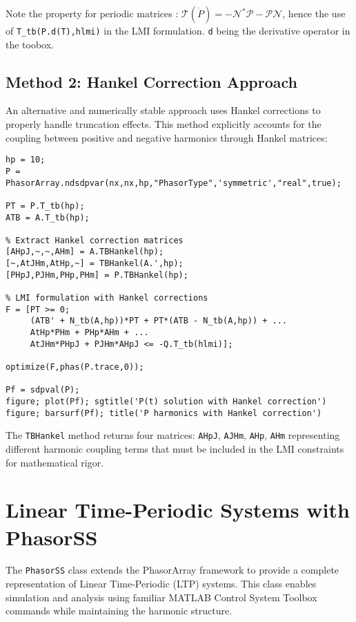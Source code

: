 \documentclass[11pt,a4paper]{article}
\begin{document}
Note the property for periodic matrices : $\mathcal{T}(\dot P) = \mathcal{-N^* P - P N}$, hence the use of \texttt{T\_tb(P.d(T),hlmi)} in the LMI formulation. \texttt{d} being the derivative operator in the toobox.

\subsection{Method 2: Hankel Correction Approach}

An alternative and numerically stable approach uses Hankel corrections to properly handle truncation effects. This method explicitly accounts for the coupling between positive and negative harmonics through Hankel matrices:

\begin{lstlisting}[style=matlabstyle]
hp = 10;
P = PhasorArray.ndsdpvar(nx,nx,hp,"PhasorType",'symmetric',"real",true);

PT = P.T_tb(hp);
ATB = A.T_tb(hp);

% Extract Hankel correction matrices
[AHpJ,~,~,AHm] = A.TBHankel(hp);
[~,AtJHm,AtHp,~] = TBHankel(A.',hp);
[PHpJ,PJHm,PHp,PHm] = P.TBHankel(hp);

% LMI formulation with Hankel corrections
F = [PT >= 0; 
     (ATB' + N_tb(A,hp))*PT + PT*(ATB - N_tb(A,hp)) + ...
     AtHp*PHm + PHp*AHm + ...
     AtJHm*PHpJ + PJHm*AHpJ <= -Q.T_tb(hlmi)];
     
optimize(F,phas(P.trace,0));

Pf = sdpval(P);
figure; plot(Pf); sgtitle('P(t) solution with Hankel correction')
figure; barsurf(Pf); title('P harmonics with Hankel correction')
\end{lstlisting}

The \texttt{TBHankel} method returns four matrices: \texttt{AHpJ}, \texttt{AJHm}, \texttt{AHp}, \texttt{AHm} representing different harmonic coupling terms that must be included in the LMI constraints for mathematical rigor.

\section{Linear Time-Periodic Systems with PhasorSS}

The \texttt{PhasorSS} class extends the PhasorArray framework to provide a complete representation of Linear Time-Periodic (LTP) systems. This class enables simulation and analysis using familiar MATLAB Control System Toolbox commands while maintaining the harmonic structure.
\end{document}
